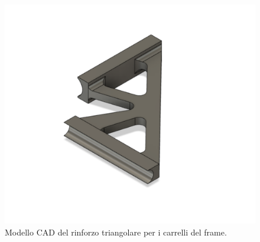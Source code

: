 \begin{figure}
    \centering
    \includegraphics[scale=0.4]{figs/chapter3/triangle.png}
    \caption{Modello CAD del rinforzo triangolare per i carrelli del frame.}
    \label{fig:triangle}
\end{figure}

